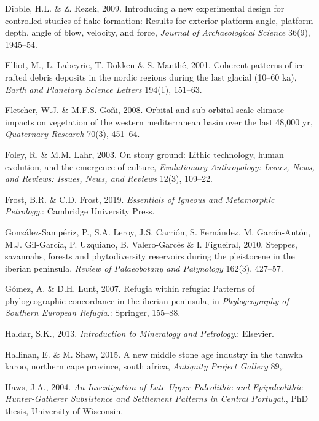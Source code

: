 \documentclass[12pt,twoside]{reedthesis}
\begin{document}
\leavevmode\hypertarget{ref-dibble2009}{}%
Dibble, H.L. \& Z. Rezek, 2009. Introducing a new experimental design for controlled studies of flake formation: Results for exterior platform angle, platform depth, angle of blow, velocity, and force, \emph{Journal of Archaeological Science} 36(9), 1945--54.

\leavevmode\hypertarget{ref-elliot2001}{}%
Elliot, M., L. Labeyrie, T. Dokken \& S. Manthé, 2001. Coherent patterns of ice-rafted debris deposits in the nordic regions during the last glacial (10--60 ka), \emph{Earth and Planetary Science Letters} 194(1), 151--63.

\leavevmode\hypertarget{ref-fletcher2008}{}%
Fletcher, W.J. \& M.F.S. Goñi, 2008. Orbital-and sub-orbital-scale climate impacts on vegetation of the western mediterranean basin over the last 48,000 yr, \emph{Quaternary Research} 70(3), 451--64.

\leavevmode\hypertarget{ref-foley2003}{}%
Foley, R. \& M.M. Lahr, 2003. On stony ground: Lithic technology, human evolution, and the emergence of culture, \emph{Evolutionary Anthropology: Issues, News, and Reviews: Issues, News, and Reviews} 12(3), 109--22.

\leavevmode\hypertarget{ref-frost2019}{}%
Frost, B.R. \& C.D. Frost, 2019. \emph{Essentials of Igneous and Metamorphic Petrology}.: Cambridge University Press.

\leavevmode\hypertarget{ref-gonzalez-samperiz2010}{}%
González-Sampériz, P., S.A. Leroy, J.S. Carrión, S. Fernández, M. García-Antón, M.J. Gil-García, P. Uzquiano, B. Valero-Garcés \& I. Figueiral, 2010. Steppes, savannahs, forests and phytodiversity reservoirs during the pleistocene in the iberian peninsula, \emph{Review of Palaeobotany and Palynology} 162(3), 427--57.

\leavevmode\hypertarget{ref-gomez2007}{}%
Gómez, A. \& D.H. Lunt, 2007. Refugia within refugia: Patterns of phylogeographic concordance in the iberian peninsula, in \emph{Phylogeography of Southern European Refugia}.: Springer, 155--88.

\leavevmode\hypertarget{ref-haldar2013}{}%
Haldar, S.K., 2013. \emph{Introduction to Mineralogy and Petrology}.: Elsevier.

\leavevmode\hypertarget{ref-hallinan2015}{}%
Hallinan, E. \& M. Shaw, 2015. A new middle stone age industry in the tanwka karoo, northern cape province, south africa, \emph{Antiquity Project Gallery} 89,.

\leavevmode\hypertarget{ref-haws2004}{}%
Haws, J.A., 2004. \emph{\textup{An Investigation of Late Upper Paleolithic and Epipaleolithic Hunter-Gatherer Subsistence and Settlement Patterns in Central Portugal.}}, PhD thesis, University of Wisconsin.
\end{document}
